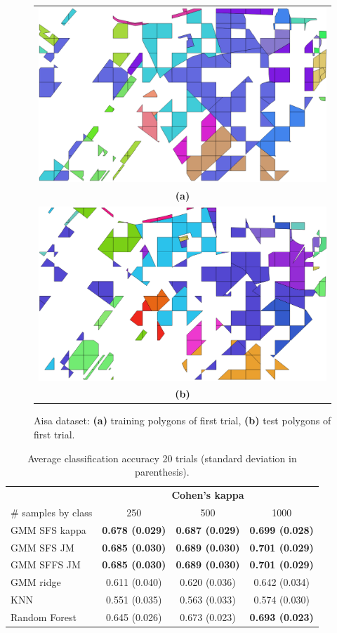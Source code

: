 \documentclass[journal,10pt]{IEEEtran}
\begin{document}
    \begin{figure}[!t]
        \centering
        \begin{tabular}{c}
            \includegraphics[width=0.6\columnwidth]{Fig/aisa_gt_train.png} \\
            {\bfseries{(a)}} \\
            \includegraphics[width=0.6\columnwidth]{Fig/aisa_gt_test.png} \\
            {\bfseries{(b)}} \\
        \end{tabular}
        \caption{Aisa dataset: {\bfseries{(a)}} training polygons of first trial, {\bfseries{(b)}} test polygons of first trial.\label{fig:set-aisa}}
    \end{figure}

    \begin{table}[!t]
        \centering
        \caption{Average classification accuracy 20 trials (standard deviation in parenthesis).\label{tab:aisa-otbsimu}}
        \begin{tabular}{lccc}\toprule
             & \multicolumn{3}{c}{\bfseries Cohen's kappa} \\ \cmidrule{2-4}
            \# samples by class & 250 & 500 & 1000 \\ \midrule

            GMM SFS kappa & {\bfseries 0.678 (0.029)} & {\bfseries 0.687 (0.029)} & {\bfseries 0.699 (0.028)} \\
            GMM SFS JM &    {\bfseries 0.685 (0.030)} & {\bfseries 0.689 (0.030)} & {\bfseries 0.701 (0.029)} \\
            GMM SFFS JM &   {\bfseries 0.685 (0.030)} & {\bfseries 0.689 (0.030)} & {\bfseries 0.701 (0.029)} \\
            GMM ridge &     0.611 (0.040) & 0.620 (0.036) & 0.642 (0.034) \\
            KNN &           0.551 (0.035) & 0.563 (0.033) & 0.574 (0.030) \\
            Random Forest & 0.645 (0.026) & 0.673 (0.023) & {\bfseries 0.693 (0.023)} \\
            \bottomrule
        \end{tabular}
    \end{table}
\end{document}
